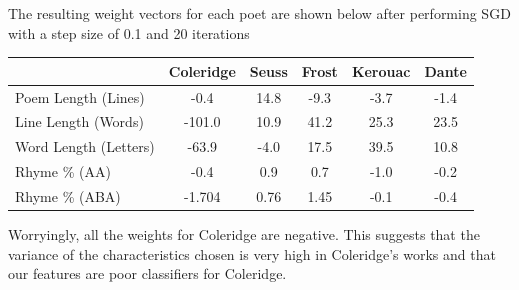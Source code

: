 \documentclass[journal]{IEEEtran}
\begin{document}
The resulting weight vectors for each poet are shown below after performing SGD with a step size of 0.1 and 20 iterations
\begin{center}
    \begin{minipage}{\columnwidth}
         \label{tab:weights} 
        \centering
        \begin{tabular}{|p{1cm}|c|c|c|c|c|}
            \hline
            & \textbf{Coleridge} & \textbf{Seuss} & \textbf{Frost} & \textbf{Kerouac} &\textbf{Dante}\\
            \hline
            \small{Poem Length (Lines)} & 
            -0.4& 14.8 & -9.3 & -3.7&-1.4\\            
            \hline
            \small{Line Length (Words)}&
            -101.0&10.9&41.2&25.3&23.5\\                       
            \hline
            \small{Word Length (Letters)}&
            -63.9 & -4.0 & 17.5 & 39.5 & 10.8\\
                        
            \hline
            \small{Rhyme  \% (AA)}&-0.4&0.9&0.7&-1.0&-0.2\\
            
            \hline
            \small{Rhyme \% (ABA)}&-1.704&0.76&1.45&-0.1&-0.4\\
                        
            \hline
            
            
        \end{tabular}    
    \end{minipage}
\end{center}

Worryingly, all the weights for Coleridge are negative. This suggests that the variance of the characteristics chosen is very high in Coleridge’s works and that our features are poor classifiers for Coleridge.
\end{document}
